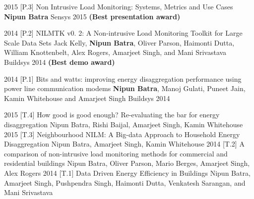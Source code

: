 
\cvpublentry
{2015}
{[P.3]}
{Non Intrusive Load Monitoring: Systems, Metrics and Use Cases}
{\textbf{Nipun Batra}}
{Sensys 2015 \textbf{(Best presentation award)}}

\cvpublentry
{2014}
{[P.2]}
{NILMTK v0. 2: A Non-intrusive Load Monitoring Toolkit for Large Scale Data Sets}
{Jack Kelly, \textbf{Nipun Batra}, Oliver Parson, Haimonti Dutta, William Knottenbelt, Alex Rogers, Amarjeet Singh,
	and Mani Srivastava}
{Buildsys 2014 \textbf{(Best demo award)}}

\cvpublentry
{2014}
{[P.1]}
{Bits and watts: improving
	energy disaggregation performance using power line communication modems}
{\textbf{Nipun Batra}, Manoj Gulati, Puneet Jain, Kamin Whitehouse and Amarjeet Singh}
{Buildsys 2014}





\cvpublentry
{2015}
{[T.4]}
{How good is good enough? Re-evaluating
	the bar for energy disaggregation}
{Nipun Batra, Rishi Baijal, Amarjeet Singh, Kamin Whitehouse}
{}
\cvpublentry
{2015}
{[T.3]}
{Neighbourhood NILM: A Big-data Approach to Household
	Energy Disaggregation}
{Nipun Batra,  Amarjeet Singh, Kamin Whitehouse}
{}
\cvpublentry
{2014}
{[T.2]}
{A comparison of non-intrusive load monitoring methods for commercial and residential buildings}
{Nipun Batra,  Oliver Parson, Mario Berges, Amarjeet Singh, Alex Rogers}
{}
\cvpublentry
{2014}
{[T.1]}
{Data Driven Energy Efficiency in Buildings}
{Nipun Batra,  Amarjeet Singh, Pushpendra Singh, Haimonti Dutta, Venkatesh Sarangan, and Mani Srivastava}
{}













